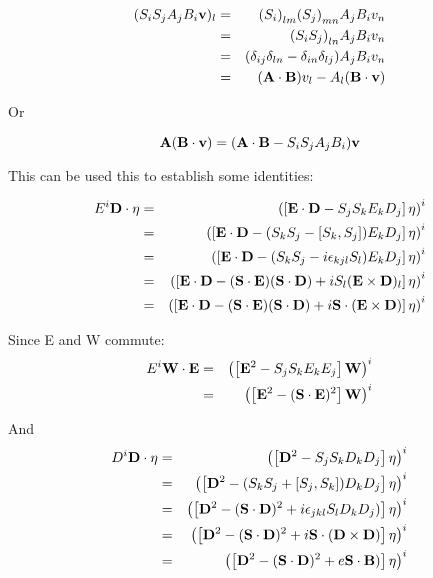 \begin{eqnarray*}
(S_i S_j A_j B_i \mathbf{v} )_l 
	&=&  	{(S_i)}_{lm} {(S_j)}_{mn} A_j B_i v_n \\
	&=&	{(S_iS_j)}_{ln} A_j B_i v_n \\
	&=&	 (\delta_{ij} \delta_{ln} - \delta_{in} \delta_{lj} ) A_j B_i v_n \\
	&=&	(\mathbf{A} \cdot \mathbf{B}) v_l  - A_l ( \mathbf{B} \cdot \mathbf{v}) \\
\end{eqnarray*}

Or 

$$ \mathbf{A} (\mathbf{B} \cdot \mathbf{v}) =  (\mathbf{A} \cdot \mathbf{B}   -  S_i S_j A_j B_i) \mathbf{v} $$

This can be used this to establish some identities:

\begin{eqnarray*}
 E^i \mathbf{D} \cdot \mathbf{\eta}
	&=&	\left( \left[\mathbf{E} \cdot \mathbf{D}  - S_j S_k E_k D_j\right] \mathbf{\eta} \right)^i		\\
	&=&	\left( \left[\mathbf{E} \cdot \mathbf{D}  - (S_k S_j  - [S_k, S_j] ) E_k D_j \right] \mathbf{\eta} \right)^i \\
	&=&	\left( \left[\mathbf{E} \cdot \mathbf{D}  - (S_k S_j - i \epsilon_{kjl} S_l ) E_k D_j \right] \mathbf{\eta} \right)^i	  \\
	&=&	\left( \left[\mathbf{E} \cdot \mathbf{D}  - (\mathbf{S} \cdot \mathbf{E})( \mathbf{S} \cdot \mathbf{D}) +  i  S_l (\mathbf{E} \times \mathbf{D})_l \right] \mathbf{\eta} \right)^i	  \\
	&=&	\left( \left[\mathbf{E} \cdot \mathbf{D}  - (\mathbf{S} \cdot \mathbf{E})( \mathbf{S} \cdot \mathbf{D}) +  i  \mathbf{S} \cdot (\mathbf{E} \times \mathbf{D})\right] \mathbf{\eta} \right)^i
\end{eqnarray*}

Since E and W commute:
\begin{eqnarray*}
 E^i \mathbf{W} \cdot \mathbf{E}
	&=& \left( \left[\mathbf{E}^2  - S_j S_k E_k E_j\right] \mathbf{W} \right)^i		\\
	&=& \left( \left[\mathbf{E}^2  - (\mathbf{S} \cdot \mathbf{E} )^2 \right] \mathbf{W} \right)^i		\\
\end{eqnarray*}

And
\begin{eqnarray*}
 D^i \mathbf{D} \cdot \mathbf{\eta}
	&=& \left( \left[\mathbf{D}^2  - S_j S_k D_k D_j\right] \mathbf{\eta} \right)^i		\\
	&=& \left( \left[\mathbf{D}^2  - (S_k S_j + [S_j, S_k]) D_k D_j\right] \mathbf{\eta} \right)^i		\\
	&=& \left( \left[\mathbf{D}^2  - (\mathbf{S} \cdot \mathbf{D})^2 + i\epsilon_{jkl} S_l D_k D_j )\right] \mathbf{\eta} \right)^i		\\
	&=& \left( \left[\mathbf{D}^2  - (\mathbf{S} \cdot \mathbf{D})^2 + i\mathbf{S} \cdot (\mathbf{D} \times \mathbf{D})  \right] \mathbf{\eta} \right)^i		\\
	&=& \left( \left[\mathbf{D}^2  - (\mathbf{S} \cdot \mathbf{D})^2 + e \mathbf{S} \cdot \mathbf{B})  \right] \mathbf{\eta} \right)^i		\\
\end{eqnarray*}

